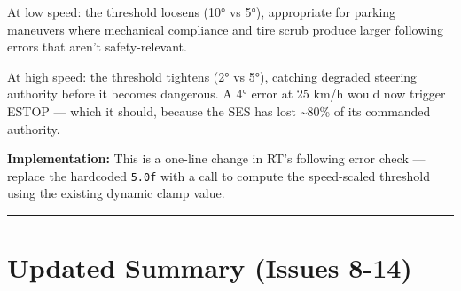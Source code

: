 \documentclass[12pt,a4paper,oneside]{report}
\begin{document}
At low speed: the threshold loosens (10° vs 5°), appropriate for parking
maneuvers where mechanical compliance and tire scrub produce larger following
errors that aren't safety-relevant.

At high speed: the threshold tightens (2° vs 5°), catching degraded steering
authority before it becomes dangerous. A 4° error at 25 km/h would now trigger
ESTOP --- which it should, because the SES has lost \textasciitilde80\% of its
commanded authority.

\textbf{Implementation:} This is a one-line change in RT's following error check
--- replace the hardcoded \texttt{5.0f} with a call to compute the speed-scaled
threshold using the existing dynamic clamp value.

\begin{center}\rule{0.5\linewidth}{0.5pt}\end{center}

\section{Updated Summary (Issues 8-14)}\label{updated-summary-issues-8-14}
\end{document}

